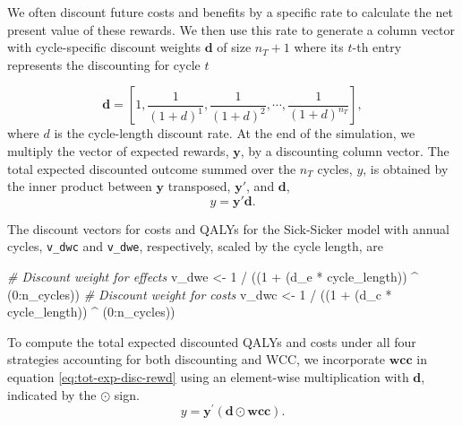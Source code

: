 \documentclass[
]{article}
\newenvironment{Shaded}{\begin{snugshade}}{\end{snugshade}}
\newcommand{\CommentTok}[1]{\textcolor[rgb]{0.56,0.35,0.01}{\textit{#1}}}
\newcommand{\DecValTok}[1]{\textcolor[rgb]{0.00,0.00,0.81}{#1}}
\newcommand{\NormalTok}[1]{#1}
\newcommand{\OtherTok}[1]{\textcolor[rgb]{0.56,0.35,0.01}{#1}}
\newcommand{\SpecialCharTok}[1]{\textcolor[rgb]{0.00,0.00,0.00}{#1}}
\begin{document}
We often discount future costs and benefits by a specific rate to calculate the net present value of these rewards. We then use this rate to generate a column vector with cycle-specific discount weights \(\mathbf{d}\) of size \(n_T+1\) where its \(t\)-th entry represents the discounting for cycle \(t\)

\[
  \mathbf{d} = \left[1, \frac{1}{(1+d)^{1}}, \frac{1}{(1+d)^{2}}, \cdots, \frac{1}{(1+d)^{n_T}}\right],
\]
where \(d\) is the cycle-length discount rate. At the end of the simulation, we multiply the vector of expected rewards, \(\mathbf{y}\), by a discounting column vector. The total expected discounted outcome summed over the \(n_T\) cycles, \(y\), is obtained by the inner product between \(\mathbf{y}\) transposed, \(\mathbf{y'}\), and \(\mathbf{d}\),
\begin{equation}
 y = \mathbf{y'} \mathbf{d}.
 \label{eq:tot-exp-disc-rewd}
\end{equation}

The discount vectors for costs and QALYs for the Sick-Sicker model with annual cycles, \texttt{v\_dwc} and \texttt{v\_dwe}, respectively, scaled by the cycle length, are

\begin{Shaded}
\begin{Highlighting}[]
\CommentTok{\# Discount weight for effects}
\NormalTok{v\_dwe }\OtherTok{\textless{}{-}} \DecValTok{1} \SpecialCharTok{/}\NormalTok{ ((}\DecValTok{1} \SpecialCharTok{+}\NormalTok{ (d\_e }\SpecialCharTok{*}\NormalTok{ cycle\_length)) }\SpecialCharTok{\^{}}\NormalTok{ (}\DecValTok{0}\SpecialCharTok{:}\NormalTok{n\_cycles))  }
\CommentTok{\# Discount weight for costs }
\NormalTok{v\_dwc }\OtherTok{\textless{}{-}} \DecValTok{1} \SpecialCharTok{/}\NormalTok{ ((}\DecValTok{1} \SpecialCharTok{+}\NormalTok{ (d\_c }\SpecialCharTok{*}\NormalTok{ cycle\_length)) }\SpecialCharTok{\^{}}\NormalTok{ (}\DecValTok{0}\SpecialCharTok{:}\NormalTok{n\_cycles))    }
\end{Highlighting}
\end{Shaded}

To compute the total expected discounted QALYs and costs under all four strategies accounting for both discounting and WCC, we incorporate \(\mathbf{wcc}\) in equation \eqref{eq:tot-exp-disc-rewd} using an element-wise multiplication with \(\mathbf{d}\), indicated by the \(\odot\) sign.
\begin{equation}
 y = \mathbf{y}^{'} \left(\mathbf{d} \odot \mathbf{wcc}\right).
 \label{eq:tot-exp-disc-rewd-wcc}
\end{equation}
\end{document}
